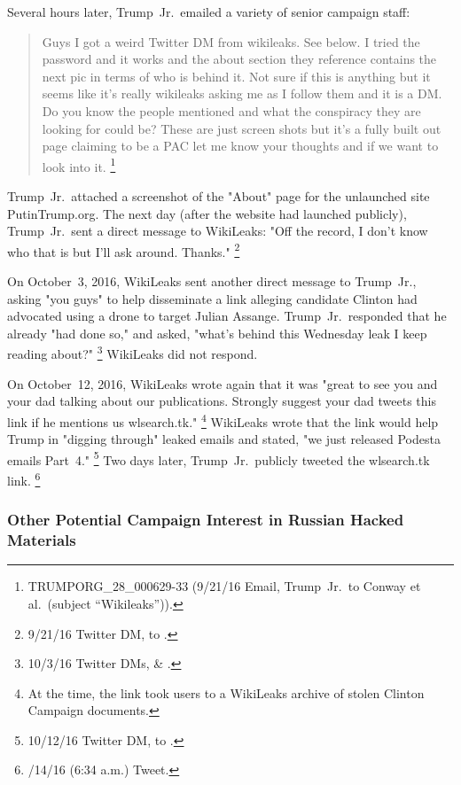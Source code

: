 Several hours later, Trump~Jr.\ emailed a variety of senior campaign staff:

\begin{quote}
Guys I got a weird Twitter DM from wikileaks.
See below.
I tried the password and it works and the about section they reference contains the next pic in terms of who is behind it.
Not sure if this is anything but it seems like it's really wikileaks asking me as I follow them and it is a DM\null.
Do you know the people mentioned and what the conspiracy they are looking for could be?
These are just screen shots but it's a fully built out page claiming to be a PAC let me know your thoughts and if we want to look into it.%
\footnote{TRUMPORG\_28\_000629-33 (9/21/16 Email, Trump~Jr.\ to Conway et al.\ (subject “Wikileaks”)).}
\end{quote}

Trump~Jr.\ attached a screenshot of the "About" page for the unlaunched site PutinTrump.org.
The next day (after the website had launched publicly), Trump~Jr.\ sent a direct message to WikiLeaks:
"Off the record, I don't know who that is but I'll ask around. Thanks."%
\footnote{9/21/16 Twitter DM, \@DonaldJTrumpJr to \@WikiLeaks.}

On October~3, 2016, WikiLeaks sent another direct message to Trump~Jr., asking "you guys" to help disseminate a link alleging candidate Clinton had advocated using a drone to target Julian Assange.
Trump~Jr.\ responded that he already "had done so," and asked, "what's behind this Wednesday leak I keep reading about?"%
\footnote{10/3/16 Twitter DMs, \@DonaldJTrumpJr \& \@WikiLeaks.}
WikiLeaks did not respond.

On October~12, 2016, WikiLeaks wrote again that it was "great to see you and your dad talking about our publications.
Strongly suggest your dad tweets this link if he mentions us wlsearch.tk."%
\footnote{At the time, the link took users to a WikiLeaks archive of stolen Clinton Campaign documents.}
WikiLeaks wrote that the link would help Trump in "digging through" leaked emails and stated, "we just released Podesta emails Part~4."%
\footnote{10/12/16 Twitter DM, \@WikiLeaks to \@DonaldJTrumpJr.}
Two days later, Trump~Jr.\ publicly tweeted the wlsearch.tk link.%
\footnote{/14/16 (6:34 a.m.) Tweet.}

\subsubsection{Other Potential Campaign Interest in Russian Hacked Materials}


